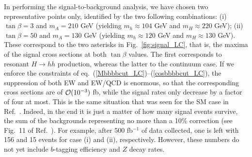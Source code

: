 In performing the signal-to-background analysis, we have chosen two
representative points only, identified by the two following
combinations: (i) $\tan\beta=3$ and $m_A=210$ GeV (yielding
$m_h\approx104$ GeV and $m_H\approx220$ GeV); (ii) $\tan\beta=50$ and
$m_A=130$ GeV (yielding $m_h\approx120$ GeV and $m_H\approx130$ GeV).
These correspond to the two asterisks in Fig.~\ref{fig:signal_LC},
that is, the maxima of the signal cross sections at both $\tan\beta$
values.  The first corresponds to resonant $H\to hh$ production,
whereas the latter to the continuum case.  If we enforce the
constraints of eq.~(\ref{Mbbbbcut_LC})--(\ref{cosbbbbcut_LC}), the
suppression of both EW and EW/QCD is enormous, so that the
corresponding cross sections are of ${\cal O}(10^{-3})$ fb, while the
signal rates only decrease by a factor of four at most.  This is the
same situation that was seen for the SM case in Ref.~\cite{noi}.
Indeed, in the end it is just a matter of how many signal events
survive, the sum of the backgrounds representing no more than a 10\%
correction (see Fig.~11 of Ref.~\cite{noi}). For example, after 500
fb$^{-1}$ of data collected,
one is left with 156 and 15 events for case (i) and (ii),
respectively. However, these numbers do not yet include $b$-tagging
efficiency and $Z$ decay rates.




